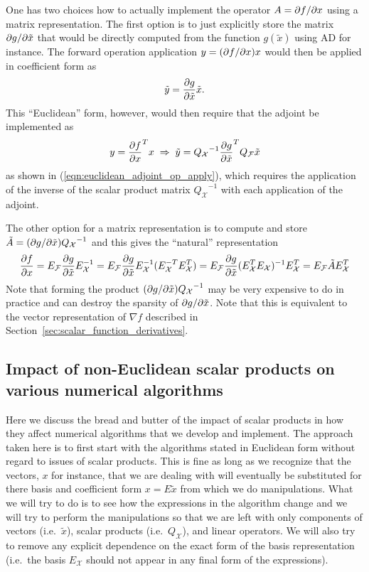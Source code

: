 One has two choices how to actually implement the operator $A = \partial f / \partial x$
using a matrix representation.  The first option is to just explicitly store
the matrix $\partial g / \partial \tilde{x}$ that would be directly computed from the
function $g(\tilde{x})$ using AD for instance.  The forward operation
application $y = (\partial f / \partial x) x$ would then be applied in coefficient form as
%
\[
\tilde{y} = \displaystyle{\frac{\partial g}{\partial \tilde{x}}} \tilde{x}.
\]
%
This ``Euclidean'' form, however, would then require that the adjoint be
implemented as
%
\begin{equation}
y = {\displaystyle{\frac{\partial f}{\partial x}}}^T x \; \Rightarrow \;
\tilde{y} = {Q_{\mathcal{X}}}^{-1} {\displaystyle{\frac{\partial g}{\partial \tilde{x}}}}^T Q_{\mathcal{F}} \tilde{x}
\label{eqn:euclidean_adjoint_jac_apply}
\end{equation}
%
as shown in (\ref{eqn:euclidean_adjoint_op_apply}), which requires the
application of the inverse of the scalar product matrix
${Q_{\mathcal{X}}}^{-1}$ with each application of the adjoint.

The other option for a matrix representation is to compute and store
$\tilde{A} = (\partial g / \partial \tilde{x}) {Q_{\mathcal{X}}}^{-1}$ and this gives the ``natural''
representation
%
\begin{equation}
\displaystyle{\frac{\partial f}{\partial x}} = E_{\mathcal{F}} \displaystyle{\frac{\partial g}{\partial \tilde{x}}} E_{\mathcal{X}}^{-1}
= E_{\mathcal{F}} \displaystyle{\frac{\partial g}{\partial \tilde{x}}} E_{\mathcal{X}}^{-1} ( E_{\mathcal{X}}^{-T} E_{\mathcal{X}}^T ) 
= E_{\mathcal{F}} \displaystyle{\frac{\partial g}{\partial \tilde{x}}} ( E_{\mathcal{X}}^T E_{\mathcal{X}} )^{-1} E_{\mathcal{X}}^T 
= E_{\mathcal{F}} \tilde{A} E_{\mathcal{X}}^T
\label{eqn:d_f_d_x_natural_rep}
\end{equation}
%
Note that forming the product $(\partial g / \partial \tilde{x}) {Q_{\mathcal{X}}}^{-1}$
may be very expensive to do in practice and can destroy the sparsity of
$\partial g / \partial \tilde{x}$.  Note that this is equivalent to the vector
representation of $\nabla f$ described in
Section~\ref{sec:scalar_function_derivatives}.

\subsection{Impact of non-Euclidean scalar products on various numerical algorithms}

Here we discuss the bread and butter of the impact of scalar products in how
they affect numerical algorithms that we develop and implement.  The approach
taken here is to first start with the algorithms stated in Euclidean form
without regard to issues of scalar products.  This is fine as long as we
recognize that the vectors, $x$ for instance, that we are dealing with will
eventually be substituted for there basis and coefficient form $x = E\tilde{x}$
from which we do manipulations.  What we will try to do is to see how the
expressions in the algorithm change and we will try to perform the
manipulations so that we are left with only components of vectors (i.e.\
$\tilde{x}$), scalar products (i.e.\ $Q_{\mathcal{X}}$), and linear operators.
We will also try to remove any explicit dependence on the exact form of the
basis representation (i.e.\ the basis $E_{\mathcal{X}}$ should not appear in
any final form of the expressions).

